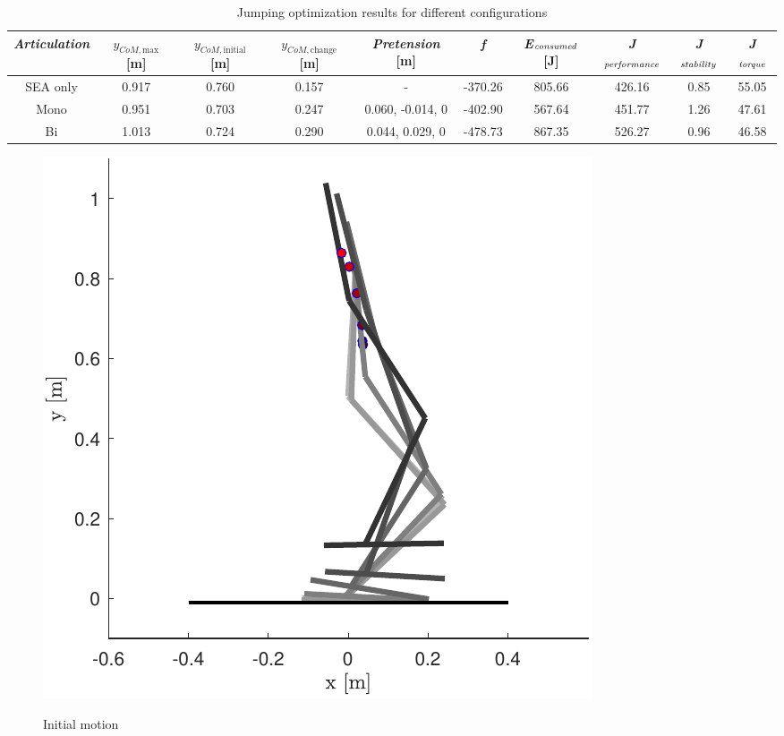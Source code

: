 \documentclass[letterpaper, 10 pt, conference]{ieeeconf}  %
\begin{document}
\begin{table}[ht]
	\caption{Jumping optimization results for different configurations}
	\label{table:maxheight}
	\begin{center}
		\begin{tabular}[t]{c|c|c||c|c|c|c|c|c|c}
			\textit{Articulation} &  $y_{CoM,\text{max}}$ [m] & $y_{CoM,\text{initial}}$ [m]& $y_{CoM,\text{change}}$ [m]& \textit{Pretension} [m] & \textit{f} & \textit{E}$_{\text{\textit{consumed}}}$ [J] & \textit{J}$_{\text{\textit{performance}}}$ & \textit{J}$_{\text{\textit{stability}}}$ & \textit{J}$_{\text{\textit{torque}}}$\\ 
			\hline
			SEA only& 0.917 &0.760  &0.157 &- &-370.26  & 805.66 & 426.16  &0.85  &   55.05\\
			\hline
			Mono &0.951 &0.703 &0.247 &  0.060, -0.014, 0  & -402.90 & 567.64& 451.77 & 1.26 &47.61 \\
			\hline
			Bi &1.013 &0.724 &0.290 &  0.044, 0.029, 0 & -478.73 & 867.35 & 526.27 & 0.96 & 46.58
		\end{tabular}
	\end{center}
\end{table}

\begin{figure}[b]
	\centering
	{\includegraphics[scale=0.6]{initialguess}
	}%
	\caption{Initial motion} \label{fig:seq}	
\end{figure}
\end{document}
